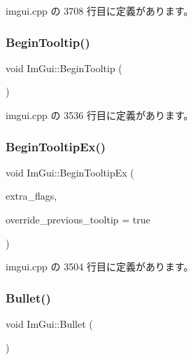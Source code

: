  imgui.\+cpp の 3708 行目に定義があります。

\mbox{\label{namespace_im_gui_a36816a48385f4759d746a03cf6202512}} 
\subsubsection{\texorpdfstring{Begin\+Tooltip()}{BeginTooltip()}}
{\footnotesize\ttfamily void Im\+Gui\+::\+Begin\+Tooltip (\begin{DoxyParamCaption}{ }\end{DoxyParamCaption})}



 imgui.\+cpp の 3536 行目に定義があります。

\mbox{\label{namespace_im_gui_a3189530b7795a9b99169eb95f36c516d}} 
\subsubsection{\texorpdfstring{Begin\+Tooltip\+Ex()}{BeginTooltipEx()}}
{\footnotesize\ttfamily void Im\+Gui\+::\+Begin\+Tooltip\+Ex (\begin{DoxyParamCaption}\item[{\mbox{\hyperlink{imgui_8h_a0b8e067ab4f7a818828c8d89e531addc}{Im\+Gui\+Window\+Flags}}}]{extra\+\_\+flags,  }\item[{bool}]{override\+\_\+previous\+\_\+tooltip = {\ttfamily true} }\end{DoxyParamCaption})}



 imgui.\+cpp の 3504 行目に定義があります。

\mbox{\label{namespace_im_gui_ae2d22212681556d2c2398dfd152f3121}} 
\subsubsection{\texorpdfstring{Bullet()}{Bullet()}}
{\footnotesize\ttfamily void Im\+Gui\+::\+Bullet (\begin{DoxyParamCaption}{ }\end{DoxyParamCaption})}



